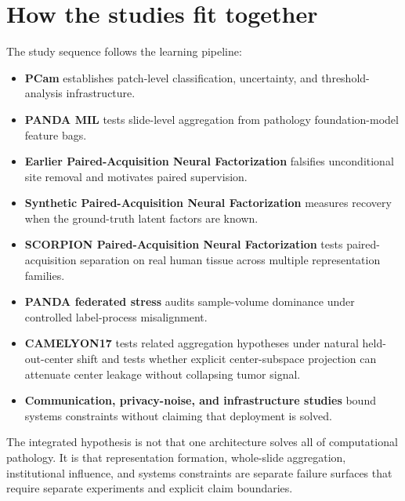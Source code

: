 \section{How the studies fit together}
The study sequence follows the learning pipeline:
\begin{itemize}[leftmargin=*]
  \item \textbf{PCam} establishes patch-level classification, uncertainty, and threshold-analysis infrastructure.
  \item \textbf{PANDA MIL} tests slide-level aggregation from pathology foundation-model feature bags.
  \item \textbf{Earlier Paired-Acquisition Neural Factorization} falsifies unconditional site removal and motivates paired supervision.
  \item \textbf{Synthetic Paired-Acquisition Neural Factorization} measures recovery when the ground-truth latent factors are known.
  \item \textbf{SCORPION Paired-Acquisition Neural Factorization} tests paired-acquisition separation on real human tissue across multiple representation families.
  \item \textbf{PANDA federated stress} audits sample-volume dominance under controlled label-process misalignment.
  \item \textbf{CAMELYON17} tests related aggregation hypotheses under natural held-out-center shift and tests whether explicit center-subspace projection can attenuate center leakage without collapsing tumor signal.
  \item \textbf{Communication, privacy-noise, and infrastructure studies} bound systems constraints without claiming that deployment is solved.
\end{itemize}

The integrated hypothesis is not that one architecture solves all of computational pathology. It is that representation formation, whole-slide aggregation, institutional influence, and systems constraints are separate failure surfaces that require separate experiments and explicit claim boundaries.
